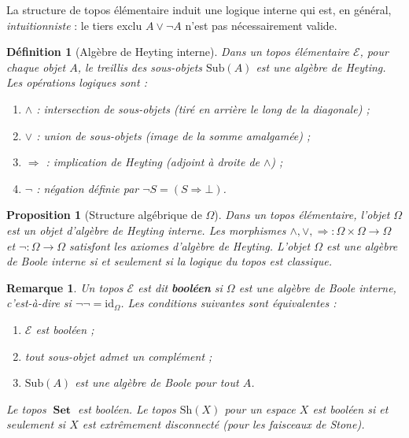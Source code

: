 \documentclass[a4paper,12pt]{book}
\DeclareMathOperator{\Set}{\mathbf{Set}}
\newcommand{\id}{\mathrm{id}}
\newtheorem{proposition}[theoreme]{Proposition}
\newtheorem{definition}[theoreme]{Définition}
\newtheorem*{remarque}{Remarque}
\begin{document}

La structure de topos élémentaire induit une logique interne
qui est, en général, \emph{intuitionniste} : le tiers exclu
$A \vee \neg A$ n'est pas nécessairement valide.

\begin{definition}[Algèbre de Heyting interne]\label{def:heyting-interne}
Dans un topos élémentaire $\mathcal{E}$, pour chaque objet $A$,
le treillis des sous-objets $\mathrm{Sub}(A)$ est une algèbre de Heyting.
Les opérations logiques sont :
\begin{enumerate}[label=(\roman*)]
\item $\wedge$ : intersection de sous-objets (tiré en arrière le
      long de la diagonale) ;
\item $\vee$ : union de sous-objets (image de la somme
      amalgamée) ;
\item $\Rightarrow$ : implication de Heyting (adjoint à droite de
      $\wedge$) ;
\item $\neg$ : négation définie par $\neg S = (S \Rightarrow \bot)$.
\end{enumerate}
\end{definition}

\begin{proposition}[Structure algébrique de $\Omega$]\label{prop:omega-heyting}
Dans un topos élémentaire, l'objet $\Omega$ est un objet d'algèbre
de Heyting interne.  Les morphismes
$\wedge, \vee, \Rightarrow \colon \Omega \times \Omega \to \Omega$
et $\neg \colon \Omega \to \Omega$ satisfont les axiomes d'algèbre
de Heyting.  L'objet $\Omega$ est une algèbre de Boole interne si et
seulement si la logique du topos est classique.
\end{proposition}

\begin{remarque}\label{rem:topos-logique-classique}
Un topos $\mathcal{E}$ est dit \textbf{booléen} si $\Omega$ est
une algèbre de Boole interne, c'est-à-dire si
$\neg \neg = \id_\Omega$.  Les conditions suivantes sont
équivalentes :
\begin{enumerate}[label=(\roman*)]
\item $\mathcal{E}$ est booléen ;
\item tout sous-objet admet un complément ;
\item $\mathrm{Sub}(A)$ est une algèbre de Boole pour tout $A$.
\end{enumerate}
Le topos $\Set$ est booléen.  Le topos $\mathrm{Sh}(X)$ pour un
espace $X$ est booléen si et seulement si $X$ est
extrêmement disconnecté (pour les faisceaux de Stone).
\end{remarque}
\end{document}
